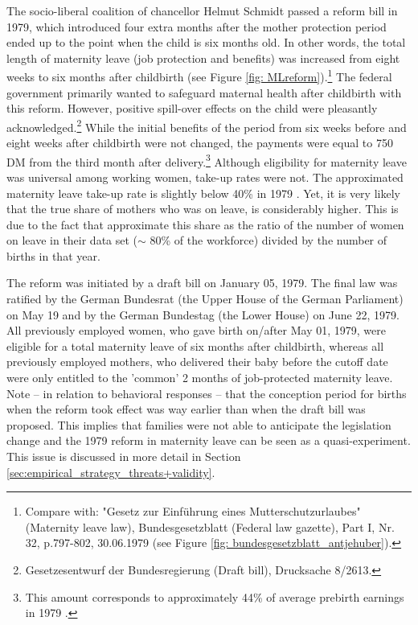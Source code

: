 \documentclass[11pt, a4paper]{article} %
\begin{document}
The socio-liberal coalition of chancellor Helmut Schmidt passed a reform bill in 1979, which introduced four extra months after the mother protection period ended up to the point when the child is six months old. In other words, the total length of maternity leave (job protection and benefits) was increased from eight weeks to six months after childbirth (see Figure \ref{fig: MLreform}).\footnote{Compare with: "Gesetz zur Einführung eines Mutterschutzurlaubes" (Maternity leave law), Bundesgesetzblatt (Federal law gazette), Part I, Nr. 32, p.797-802, 30.06.1979 (see Figure \ref{fig: bundesgesetzblatt_antjehuber}).} The federal government primarily wanted to safeguard maternal health after childbirth with this reform. However, positive spill-over effects on the child were pleasantly acknowledged.\footnote{Gesetzesentwurf der Bundesregierung (Draft bill), Drucksache 8/2613.} While the initial benefits of the period from six weeks before and eight weeks after childbirth were not changed, the payments were equal to 750 DM from the third month after delivery.\footnote{This amount corresponds to approximately 44\% of average prebirth earnings in 1979 \citep{schonberg2014expansions}.} Although eligibility for maternity leave was universal among working women, take-up rates were not. The approximated maternity leave take-up rate is slightly below 40\% in 1979 \citep{Dustmann2012}. Yet, it is very likely that the true share of mothers who was on leave, is considerably higher. This is due to the fact that \cite{Dustmann2012} approximate this share as the ratio of the number of women on leave in their data set ($\sim$ 80\% of the workforce) divided by the number of births in that year.
\newline

The reform was initiated by a draft bill on January 05, 1979. The final law was ratified by the German Bundesrat (the Upper House of the German Parliament) on May 19 and by the German Bundestag (the Lower House) on June 22, 1979.  All previously employed women, who gave birth on/after May 01, 1979, were eligible for a total maternity leave of six months after childbirth, whereas all previously employed mothers, who delivered their baby before the cutoff date were only entitled to the 'common' 2 months of job-protected maternity leave. Note -- in relation to behavioral responses -- that the conception period for births when the reform took effect was way earlier than when the draft bill was proposed. This implies that families were not able to anticipate the legislation change and the 1979 reform in maternity leave can be seen as a quasi-experiment. This issue is discussed in more detail in Section \ref{sec:empirical_strategy_threats+validity}.\newline
\end{document}
